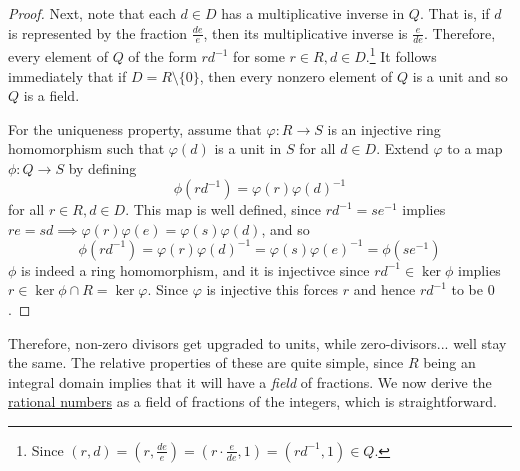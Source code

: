 \begin{proof}
    Next, note that each $d \in D$ has a multiplicative inverse in $Q$. That is, if $d$ is represented by the fraction $\frac{de}{e}$, then its multiplicative inverse is $\frac{e}{de}$. Therefore, every element of $Q$ of the form $r d^{-1}$ for some $r \in R, d \in D$.\footnote{Since $(r, d) = (r, \frac{de}{e}) = (r \cdot \frac{e}{de}, 1) = (r d^{-1}, 1) \in Q$.} It follows immediately that if $D = R \setminus \{0\}$, then every nonzero element of $Q$ is a unit and so $Q$ is a field.  

    For the uniqueness property, assume that $\varphi: R \to S$ is an injective ring homomorphism such that $\varphi(d)$ is a unit in $S$ for all $d \in D$. Extend $\varphi$ to a map $\phi: Q \to S$ by defining 
    \begin{equation}
      \phi(r d^{-1})  = \varphi(r) \varphi(d)^{-1} 
    \end{equation}
    for all $r \in R, d \in D$. This map is well defined, since $r d^{-1} = s e^{-1}$ implies $re = sd \implies \varphi(r) \varphi(e) = \varphi(s) \varphi(d)$, and so 
    \begin{equation}
      \phi(r d^{-1}) = \varphi(r) \varphi(d)^{-1} = \varphi(s) \varphi(e)^{-1} = \phi(s e^{-1})
    \end{equation}
    $\phi$ is indeed a ring homomorphism, and it is injectivce since $rd^{-1} \in \ker{\phi}$ implies $r \in \ker{\phi} \cap R = \ker{\varphi}$. Since $\varphi$ is injective this forces $r$ and hence $rd^{-1}$ to be $0$. 
  \end{proof}

  Therefore, non-zero divisors get upgraded to units, while zero-divisors... well stay the same. The relative properties of these are quite simple, since $R$ being an integral domain implies that it will have a \textit{field} of fractions. We now derive the \hyperref[st-thm:rational-numbers]{rational numbers} as a field of fractions of the integers, which is straightforward. 

